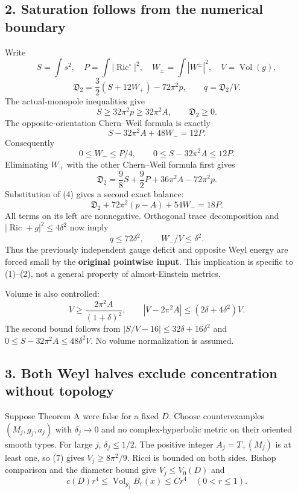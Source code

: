 \documentclass[
  11pt,
]{article}
\begin{document}
\hypertarget{saturation-follows-from-the-numerical-boundary}{%
\subsection{2. Saturation follows from the numerical
boundary}\label{saturation-follows-from-the-numerical-boundary}}

Write \[
 S=\int s^2,\quad P=\int|\operatorname{Ric}^{\circ}|^2,\quad
 W_\pm=\int|W^\pm|^2,\quad V=\operatorname{Vol}(g),
\] \[
 \mathfrak D_2=\frac32(S+12W_+)-72\pi^2p,\qquad q=\mathfrak D_2/V.
\] The actual-monopole inequalities give \[
 S\ge32\pi^2p\ge32\pi^2A,\qquad \mathfrak D_2\ge0.          \tag{3}
\] The opposite-orientation Chern--Weil formula is exactly \[
                    S-32\pi^2A+48W_-=12P.                \tag{4}
\] Consequently \[
 0\le W_-\le P/4,\qquad 0\le S-32\pi^2A\le12P.
\] Eliminating \(W_+\) with the other Chern--Weil formula first gives \[
 \mathfrak D_2=\frac98S+\frac92P+36\pi^2A-72\pi^2p.
\] Substitution of (4) gives a second exact balance: \[
 \boxed{\mathfrak D_2+72\pi^2(p-A)+54W_-=18P.}             \tag{5}
\] All terms on its left are nonnegative. Orthogonal trace decomposition
and \(|\operatorname{Ric}+g|^2\le4\delta^2\) now imply \[
 \boxed{q\le72\delta^2,\qquad W_-/V\le\delta^2.}           \tag{6}
\] Thus the previously independent gauge deficit and opposite Weyl
energy are forced small by the \textbf{original pointwise input}. This
implication is specific to (1)--(2), not a general property of
almost-Einstein metrics.

Volume is also controlled: \[
 V\ge\frac{2\pi^2A}{(1+\delta)^2},\qquad
 |V-2\pi^2A|\le(2\delta+4\delta^2)V.                       \tag{7}
\] The second bound follows from \(|S/V-16|\le32\delta+16\delta^2\) and
\(0\le S-32\pi^2A\le48\delta^2V\). No volume normalization is assumed.

\hypertarget{both-weyl-halves-exclude-concentration-without-topology}{%
\subsection{3. Both Weyl halves exclude concentration without
topology}\label{both-weyl-halves-exclude-concentration-without-topology}}

Suppose Theorem A were false for a fixed \(D\). Choose counterexamples
\((M_j,g_j,a_j)\) with \(\delta_j\to0\) and no complex-hyperbolic metric
on their oriented smooth types. For large \(j\), \(\delta_j\le1/2\). The
positive integer \(A_j=T_+(M_j)\) is at least one, so (7) gives
\(V_j\ge8\pi^2/9\). Ricci is bounded on both sides. Bishop comparison
and the diameter bound give \(V_j\le V_0(D)\) and \[
 c(D)r^4\le \operatorname{Vol}_{g_j}B_r(x)\le Cr^4
 \quad(0<r\le1).                                        \tag{8}
\]
\end{document}
